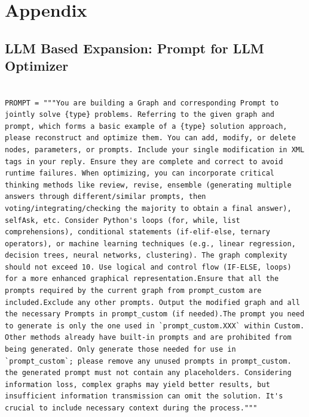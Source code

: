 \documentclass{article} %
\theoremstyle{plain}
\theoremstyle{definition}
\theoremstyle{remark}
\begin{document}



\clearpage
\appendix
\section{Appendix}

\setcounter{table}{0}  
\setcounter{figure}{0}
\setcounter{algorithm}{0}
\renewcommand{\thetable}{A\arabic{table}}
\renewcommand{\thefigure}{A\arabic{figure}}


\subsection{LLM Based Expansion: Prompt for LLM Optimizer}
\label{appendix:prompt}

\begin{tcolorbox}[title={\textbf{\small Workflow optimize prompt}}, boxrule=2pt, arc=0mm, breakable]\begin{verbatim}

PROMPT = """You are building a Graph and corresponding Prompt to jointly solve {type} problems. Referring to the given graph and prompt, which forms a basic example of a {type} solution approach, please reconstruct and optimize them. You can add, modify, or delete nodes, parameters, or prompts. Include your single modification in XML tags in your reply. Ensure they are complete and correct to avoid runtime failures. When optimizing, you can incorporate critical thinking methods like review, revise, ensemble (generating multiple answers through different/similar prompts, then voting/integrating/checking the majority to obtain a final answer), selfAsk, etc. Consider Python's loops (for, while, list comprehensions), conditional statements (if-elif-else, ternary operators), or machine learning techniques (e.g., linear regression, decision trees, neural networks, clustering). The graph complexity should not exceed 10. Use logical and control flow (IF-ELSE, loops) for a more enhanced graphical representation.Ensure that all the prompts required by the current graph from prompt_custom are included.Exclude any other prompts. Output the modified graph and all the necessary Prompts in prompt_custom (if needed).The prompt you need to generate is only the one used in `prompt_custom.XXX` within Custom. Other methods already have built-in prompts and are prohibited from being generated. Only generate those needed for use in `prompt_custom`; please remove any unused prompts in prompt_custom. the generated prompt must not contain any placeholders. Considering information loss, complex graphs may yield better results, but insufficient information transmission can omit the solution. It's crucial to include necessary context during the process."""
\end{verbatim}
\end{tcolorbox}
\end{document}
